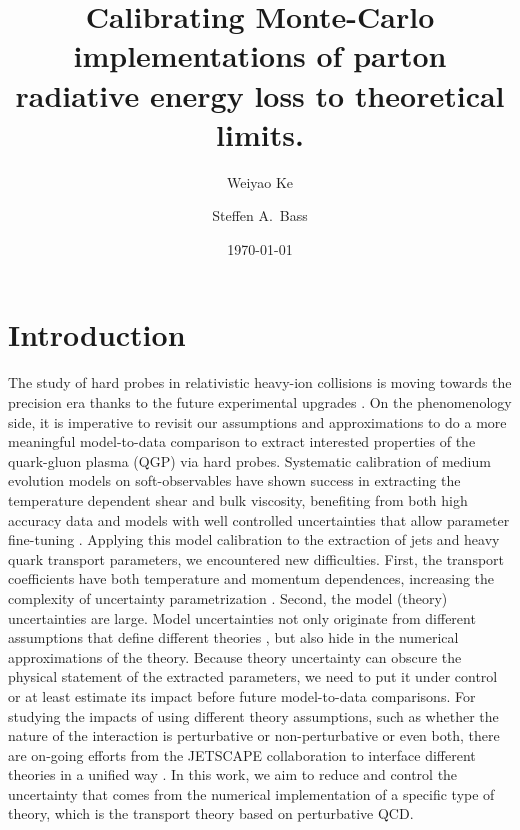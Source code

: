\documentclass[aps, prc, reprint, amsmath, groupedaddress, nofootinbib]{revtex4-1}
\begin{document}
\title{Calibrating Monte-Carlo implementations of parton radiative energy loss to theoretical limits.}
\author{Weiyao Ke}
\author{Steffen A.\ Bass}
\date{\today}
\maketitle 

\section{Introduction}
The study of hard probes in relativistic heavy-ion collisions is moving towards the precision era thanks to the future experimental upgrades \cite{ATLAS-Collaboration:2012iwa,Abelevetal:2014dna,STAR:upgrade-hf,Adare:2015kwa,CMS:2017dec}.
On the phenomenology side, it is imperative to revisit our assumptions and approximations to do a more meaningful model-to-data comparison to extract interested properties of the quark-gluon plasma (QGP) via hard probes.
Systematic calibration of medium evolution models on soft-observables have shown success in extracting the temperature dependent shear and bulk viscosity, benefiting from both high accuracy data and models with well controlled uncertainties that allow parameter fine-tuning \cite{Bernhard:2016tnd, Bernhard:2018hnz}.
Applying this model calibration to the extraction of jets and heavy quark transport parameters, we encountered new difficulties. 
First, the transport coefficients have both temperature and momentum dependences, increasing the complexity of uncertainty parametrization \cite{Xu:2017obm}.
Second, the model (theory) uncertainties are large. 
Model uncertainties not only originate from different assumptions that define different theories \cite{CaronHuot:2010bp, Rapp:2018qla}, but also hide in the numerical approximations of the theory.
Because theory uncertainty can obscure the physical statement of the extracted parameters, we need to put it under control or at least estimate its impact before future model-to-data comparisons.
For studying the impacts of using different theory assumptions, such as whether the nature of the interaction is perturbative or non-perturbative or even both, there are on-going efforts from the JETSCAPE collaboration to interface different theories in a unified way \cite{Cao:2017zih, Kauder:2018cdt}.
In this work, we aim to reduce and control the uncertainty that comes from the numerical implementation of a specific type of theory, which is the transport theory based on perturbative QCD.
\end{document}
